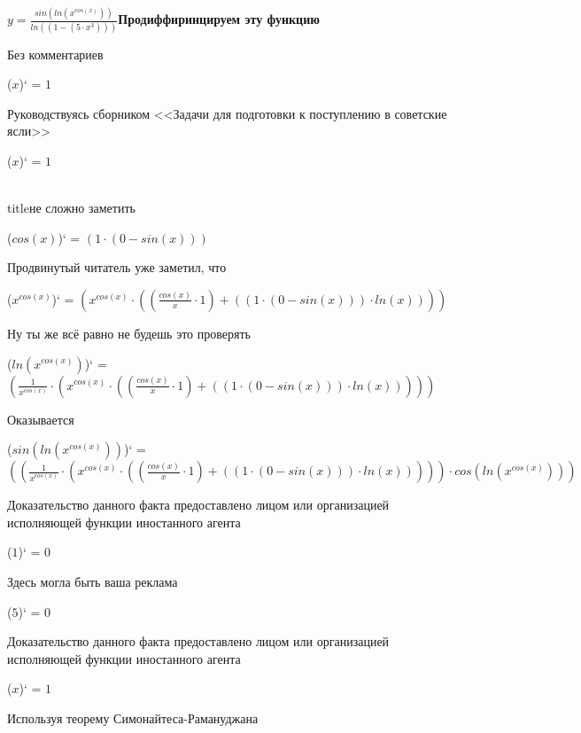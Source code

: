 \documentclass[12pt,a4paper,fleqn]{article}
\begin{document}
$y = $$\frac{sin(ln(x^{cos(x)}))}{ln((1 - (5 \cdot x^{3})))}$\newpage \textbf{\Huge Продиффиринцируем эту функцию}

Без комментариев

\begin{center}
($x$)`
 = $1$\end{center}
Руководствуясь сборником <<Задачи для подготовки к поступлению в советские ясли>>

\begin{center}
($x$)`
 = $1$\end{center}
\\ title{не сложно заметить} 

\begin{center}
($cos(x)$)`
 = $(1 \cdot (0 - sin(x)))$\end{center}
Продвинутый читатель уже заметил, что

\begin{center}
($x^{cos(x)}$)`
 = $(x^{cos(x)} \cdot ((\frac{cos(x)}{x} \cdot 1) + ((1 \cdot (0 - sin(x))) \cdot ln(x))))$\end{center}
Ну ты же всё равно не будешь это проверять

\begin{center}
($ln(x^{cos(x)})$)`
 = $(\frac{1}{x^{cos(x)}} \cdot (x^{cos(x)} \cdot ((\frac{cos(x)}{x} \cdot 1) + ((1 \cdot (0 - sin(x))) \cdot ln(x)))))$\end{center}
Оказывается

\begin{center}
($sin(ln(x^{cos(x)}))$)`
 = $((\frac{1}{x^{cos(x)}} \cdot (x^{cos(x)} \cdot ((\frac{cos(x)}{x} \cdot 1) + ((1 \cdot (0 - sin(x))) \cdot ln(x))))) \cdot cos(ln(x^{cos(x)})))$\end{center}
Доказательство данного факта предоставлено лицом или организацией исполняющей функции иностанного агента

\begin{center}
($1$)`
 = $0$\end{center}
Здесь могла быть ваша реклама

\begin{center}
($5$)`
 = $0$\end{center}
Доказательство данного факта предоставлено лицом или организацией исполняющей функции иностанного агента

\begin{center}
($x$)`
 = $1$\end{center}
Используя теорему Симонайтеса-Рамануджана
\end{document}
